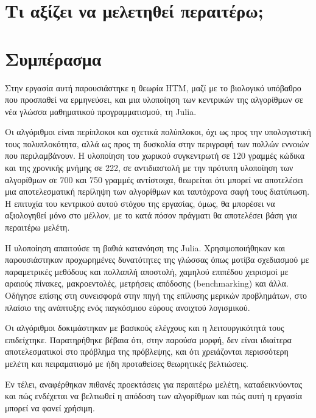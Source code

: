\section{Τι αξίζει να μελετηθεί περαιτέρω;} \label{conc:study-suggestions}

\section{Συμπέρασμα}

	Στην εργασία αυτή παρουσιάστηκε η θεωρία HTM, μαζί με το βιολογικό υπόβαθρο που προσπαθεί να ερμηνεύσει,
	και μια υλοποίηση των κεντρικών της αλγορίθμων σε νέα γλώσσα μαθηματικού προγραμματισμού, τη Julia.

	Οι αλγόριθμοι είναι περίπλοκοι και σχετικά πολύπλοκοι, όχι ως προς την υπολογιστική τους πολυπλοκότητα,
	αλλά ως προς τη δυσκολία στην περιγραφή των πολλών εννοιών που περιλαμβάνουν.
	Η υλοποίηση του χωρικού συγκεντρωτή σε 120 γραμμές κώδικα και της χρονικής μνήμης σε 222,
	σε αντιδιαστολή με την πρότυπη υλοποίηση των αλγορίθμων σε 700 και 750 γραμμές αντίστοιχα,
	θεωρείται ότι μπορεί να αποτελέσει μια αποτελεσματική περίληψη των αλγορίθμων και ταυτόχρονα σαφή τους διατύπωση.
	Η επιτυχία του κεντρικού αυτού στόχου της εργασίας, όμως, θα μπορέσει να αξιολογηθεί μόνο στο μέλλον, με το κατά πόσον πράγματι θα αποτελέσει βάση για περαιτέρω μελέτη.

	Η υλοποίηση απαιτούσε τη βαθιά κατανόηση της Julia.
	Χρησιμοποιήθηκαν και παρουσιάστηκαν προχωρημένες δυνατότητες της γλώσσας όπως μοτίβα σχεδιασμού με παραμετρικές μεθόδους και πολλαπλή αποστολή,
	χαμηλού επιπέδου χειρισμοί με αραιούς πίνακες, μακροεντολές, μετρήσεις απόδοσης (benchmarking) και άλλα.
	Οδήγησε επίσης στη συνεισφορά στην πηγή της επίλυσης μερικών προβλημάτων, στο πλαίσιο της ανάπτυξης ενός παγκόσμιου εύρους ανοιχτού λογισμικού.

	Οι αλγόριθμοι δοκιμάστηκαν με βασικούς ελέγχους και η λειτουργικότητά τους επιδείχτηκε.
	Παρατηρήθηκε βέβαια ότι, στην παρούσα μορφή, δεν είναι ιδιαίτερα αποτελεσματικοί στο πρόβλημα της πρόβλεψης,
	και ότι χρειάζονται περισσότερη μελέτη και πειραματισμό με ήδη προταθείσες θεωρητικές βελτιώσεις.

	Εν τέλει, αναφέρθηκαν πιθανές προεκτάσεις για περαιτέρω μελέτη, καταδεικνύοντας και πώς ενδέχεται να βελτιωθεί η απόδοση των αλγορίθμων
	και πώς αυτή η εργασία μπορεί να φανεί χρήσιμη.
